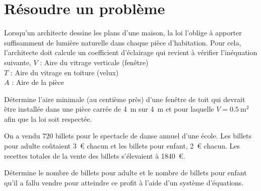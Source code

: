 \documentclass[a4paper, 12pt, parskip=half-, twoside=semi]{scrartcl}
\begin{document}
\section*{ Résoudre un problème}
\begin{transferer}[points=3]
    Lorsqu'un architecte dessine les plans d'une maison, la loi l'oblige à apporter suffisamment de lumière naturelle dans chaque pièce d'habitation. Pour cela, l'architecte doit calcule un coefficient d'éclairage qui revient à vérifier l'inéquation suivante,
    {%
        $V$ : Aire du vitrage verticale (fenêtre)\\
        $T$ : Aire du vitrage en toiture (velux)\\
        $A$ : Aire de la pièce
    }

    Détermine l'aire minimale (au centième près) d'une fenêtre de toit qui devrait être installée dans une pièce carrée de \SI{4}{\metre} sur \SI{4}{\metre} et pour laquelle $V=\SI{0,5}{\square\metre}$ afin que la loi soit respectée.



\end{transferer}
\begin{transferer}[points=4]
    On a vendu $720$ billets pour le spectacle de danse annuel d'une école. Les billets pour adulte coûtaient 3~€ chacun et les billets pour enfant, 2~€ chacun. Les recettes totales de la vente des billets s'élevaient à \num{1840}~€.

    Détermine le nombre de billets pour adulte et le nombre de billets pour enfant qu'il a fallu vendre pour atteindre ce profit à l'aide d'un système d'équations.
\end{transferer}
\end{document}
